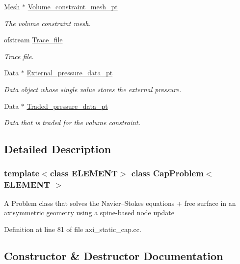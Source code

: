 \begin{DoxyCompactItemize}
Mesh $\ast$ \hyperlink{classCapProblem_a4c6655c91412cb031cc2d06ab3ad40f9}{Volume\+\_\+constraint\+\_\+mesh\+\_\+pt}
\begin{DoxyCompactList}\small\item\em The volume constraint mesh. \end{DoxyCompactList}\item 
ofstream \hyperlink{classCapProblem_a46ba6cbe3e82a36db8831fdd53d9f3a9}{Trace\+\_\+file}
\begin{DoxyCompactList}\small\item\em Trace file. \end{DoxyCompactList}\item 
Data $\ast$ \hyperlink{classCapProblem_a3990e9e6a2e4545a470e84ff1fead5eb}{External\+\_\+pressure\+\_\+data\+\_\+pt}
\begin{DoxyCompactList}\small\item\em Data object whose single value stores the external pressure. \end{DoxyCompactList}\item 
Data $\ast$ \hyperlink{classCapProblem_a1ef465adfeb4804ba6e1cd3881c8277b}{Traded\+\_\+pressure\+\_\+data\+\_\+pt}
\begin{DoxyCompactList}\small\item\em Data that is traded for the volume constraint. \end{DoxyCompactList}\end{DoxyCompactItemize}


\subsection{Detailed Description}
\subsubsection*{template$<$class E\+L\+E\+M\+E\+NT$>$\newline
class Cap\+Problem$<$ E\+L\+E\+M\+E\+N\+T $>$}

A Problem class that solves the Navier--Stokes equations + free surface in an axisymmetric geometry using a spine-\/based node update 

Definition at line 81 of file axi\+\_\+static\+\_\+cap.\+cc.



\subsection{Constructor \& Destructor Documentation}
\mbox{\label{classCapProblem_ab03ed8e2c1b44911d11209e00cb28a42}} 
